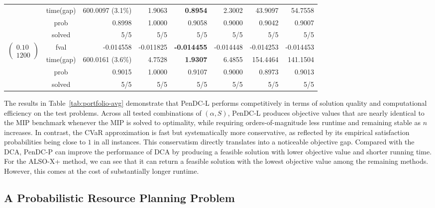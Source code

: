 \documentclass[11pt]{article}
\begin{document}
\begin{table}[ht!]
\begin{tabular}{ccrrrrrr}
& time(gap)  & 600.0097 (3.1\%) & 1.9063 & \textbf{0.8954} & 2.3002 & 43.9097 & 54.7558\\
& prob  & 0.8998 & 1.0000 & 0.9058 & 0.9000 & 0.9042 & 0.9007\\
& solved & 5/5 & 5/5 & 5/5 & 5/5 & 5/5 & 5/5\\
\midrule
\multirow{4}{*}{$\left(\begin{array}{c} 0.10 \\ 1200 \end{array}\right)$} & fval  & -0.014558 & -0.011825 & \textbf{-0.014455} & -0.014448 & -0.014253 & -0.014453\\
& time(gap)  & 600.0161 (3.6\%) & 4.7528 & \textbf{1.9307} & 6.4855 & 154.4464 & 141.1504\\
& prob  & 0.9015 & 1.0000 & 0.9107 & 0.9000 & 0.8973 & 0.9013\\
& solved & 5/5 & 5/5 & 5/5 & 5/5 & 5/5 & 5/5\\
\bottomrule
\end{tabular}
\end{table}

The results in Table~\ref{tab:portfolio-avg} demonstrate that PenDC-L performs competitively in terms of solution quality and computational efficiency on the test problems.
Across all tested combinations of $(\alpha,S)$, PenDC-L produces objective values that are nearly identical to the MIP benchmark whenever the MIP is solved to optimality, while requiring orders-of-magnitude less runtime and remaining stable as $n$ increases. In contrast, the CVaR approximation is fast but systematically more conservative, as reflected by its empirical satisfaction probabilities being close to $1$ in all instances. This conservatism directly translates into a noticeable objective gap. Compared with the DCA, PenDC-P can improve the performance of DCA by producing a feasible solution with lower objective value and shorter running time. For the ALSO-X+ method, we can see that it can return a feasible solution with the lowest objective value among the remaining methods. However, this comes at the cost of substantially longer runtime.


\subsection{A Probabilistic Resource Planning Problem}
\end{document}
